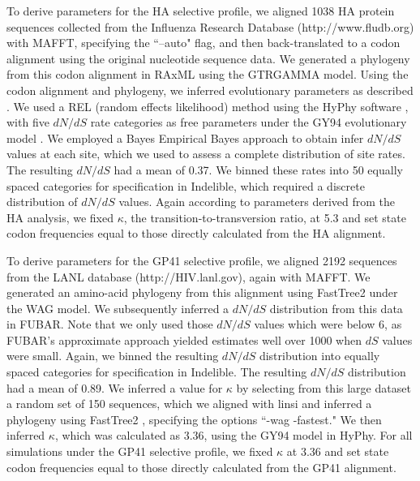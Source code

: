 \documentclass[11pt]{article}
\begin{document}
To derive parameters for the HA selective profile, we aligned 1038 HA protein sequences collected from the Influenza Research Database (http://www.fludb.org) with MAFFT, specifying the ``--auto" flag, \citep{Katoh2002,Katoh2005} and then back-translated to a codon alignment using the original nucleotide sequence data. We generated a phylogeny from this codon alignment in RAxML \citep{Stamatakis2006} using the GTRGAMMA model. Using the codon alignment and phylogeny, we inferred evolutionary parameters as described \citep{Spielman2013}. We used a REL (random effects likelihood) method \citep{NielsenYang1998} using the HyPhy software \citep{Pond2005}, with five $dN/dS$ rate categories as free parameters under the GY94 evolutionary model \citep{GoldmanYang1994}. We employed a Bayes Empirical Bayes approach \citep{Yang2000} to obtain infer $dN/dS$ values at each site, which we used to assess a complete distribution of site rates. The resulting $dN/dS$ had a mean of 0.37. We binned these rates into 50 equally spaced categories for specification in Indelible, which required a discrete distribution of $dN/dS$ values. Again according to parameters derived from the HA analysis, we fixed $\kappa$, the transition-to-transversion ratio, at 5.3 and set state codon frequencies equal to those directly calculated from the HA alignment. 

To derive parameters for the GP41 selective profile, we aligned 2192 sequences from the LANL database (http://HIV.lanl.gov), again with MAFFT. We generated an amino-acid phylogeny from this alignment using FastTree2 under the WAG model. We subsequently inferred a $dN/dS$ distribution from this data in FUBAR. Note that we only used those $dN/dS$ values which were below 6, as FUBAR's approximate approach yielded estimates well over 1000 when $dS$ values were small. Again, we binned the resulting $dN/dS$ distribution into equally spaced categories for specification in Indelible. The resulting $dN/dS$ distribution had a mean of 0.89. We inferred a value for $\kappa$ by selecting from this large dataset a random set of 150 sequences, which we aligned with linsi \citep{Katoh2002,Katoh2005} and inferred a phylogeny using FastTree2 \citep{Price2010}, specifying the options ``-wag -fastest." We then inferred $\kappa$, which was calculated as 3.36, using the GY94 model in HyPhy. For all simulations under the GP41 selective profile, we fixed $\kappa$ at 3.36 and set state codon frequencies equal to those directly calculated from the GP41 alignment. 
\end{document}

